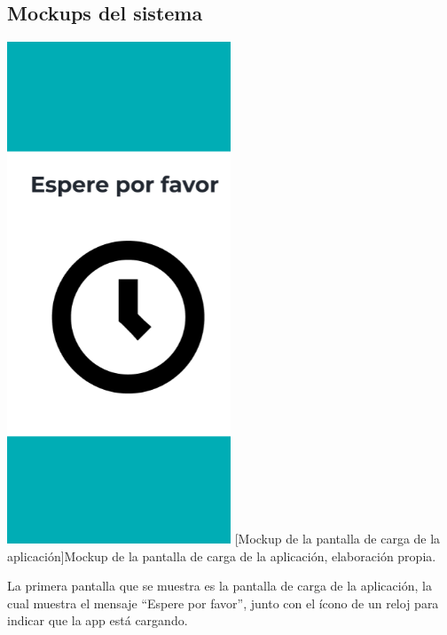 \subsection{Mockups del sistema}
\begin{center}
    \includegraphics[width=0.5\textwidth]{Images/Cap 3/Pantalla1.png}
    [Mockup de la pantalla de carga de la aplicación]{Mockup de la pantalla de carga de la aplicación, elaboración propia.}
\end{center}

La primera pantalla que se muestra es la pantalla de carga de la aplicación, la cual muestra el mensaje “Espere por favor”, junto con el ícono de un reloj para indicar que la app está cargando.


